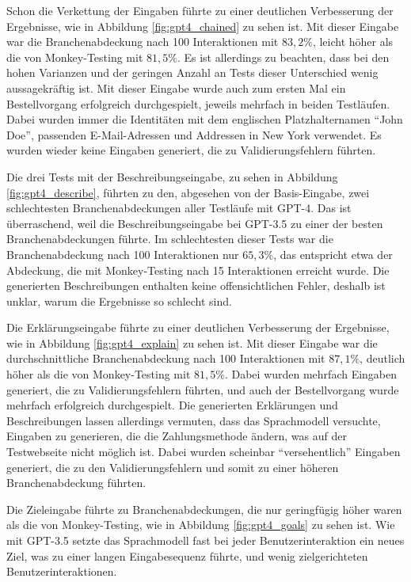 Schon die Verkettung der Eingaben führte zu einer deutlichen Verbesserung der Ergebnisse, wie in Abbildung \ref{fig:gpt4_chained} zu sehen ist.
Mit dieser Eingabe war die Branchenabdeckung nach 100 Interaktionen mit $83{,}2\%$, leicht höher als die von Monkey-Testing mit $81{,}5\%$.
Es ist allerdings zu beachten, dass bei den hohen Varianzen und der geringen Anzahl an Tests dieser Unterschied wenig aussagekräftig ist.
Mit dieser Eingabe wurde auch zum ersten Mal ein Bestellvorgang erfolgreich durchgespielt, jeweils mehrfach in beiden Testläufen.
Dabei wurden immer die Identitäten mit dem englischen Platzhalternamen \enquote{John Doe}, passenden E-Mail-Adressen und Addressen in New York verwendet.
Es wurden wieder keine Eingaben generiert, die zu Validierungsfehlern führten.

Die drei Tests mit der Beschreibungseingabe, zu sehen in Abbildung \ref{fig:gpt4_describe}, führten zu den, abgesehen von der Basis-Eingabe, zwei schlechtesten Branchenabdeckungen aller Testläufe mit GPT-4.
Das ist überraschend, weil die Beschreibungseingabe bei GPT-3.5 zu einer der besten Branchenabdeckungen führte.
Im schlechtesten dieser Tests war die Branchenabdeckung nach 100 Interaktionen nur $65{,}3\%$, das entspricht etwa der Abdeckung, die mit Monkey-Testing nach 15 Interaktionen erreicht wurde.
Die generierten Beschreibungen enthalten keine offensichtlichen Fehler, deshalb ist unklar, warum die Ergebnisse so schlecht sind.

Die Erklärungseingabe führte zu einer deutlichen Verbesserung der Ergebnisse, wie in Abbildung \ref{fig:gpt4_explain} zu sehen ist.
Mit dieser Eingabe war die durchschnittliche Branchenabdeckung nach 100 Interaktionen mit $87{,}1\%$, deutlich höher als die von Monkey-Testing mit $81{,}5\%$.
Dabei wurden mehrfach Eingaben generiert, die zu Validierungsfehlern führten, und auch der Bestellvorgang wurde mehrfach erfolgreich durchgespielt.
Die generierten Erklärungen und Beschreibungen lassen allerdings vermuten, dass das Sprachmodell versuchte, Eingaben zu generieren, die die Zahlungsmethode ändern, was auf der Testwebseite nicht möglich ist.
Dabei wurden scheinbar \enquote{versehentlich} Eingaben generiert, die zu den Validierungsfehlern und somit zu einer höheren Branchenabdeckung führten.

Die Zieleingabe führte zu Branchenabdeckungen, die nur geringfügig höher waren als die von Monkey-Testing, wie in Abbildung \ref{fig:gpt4_goals} zu sehen ist.
Wie mit GPT-3.5 setzte das Sprachmodell fast bei jeder Benutzerinteraktion ein neues Ziel, was zu einer langen Eingabesequenz führte, und wenig zielgerichteten Benutzerinteraktionen.

